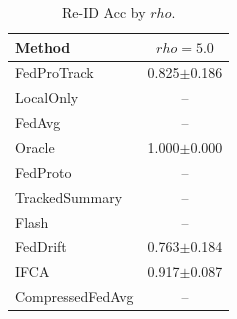 \begin{table}[t]
\centering
\caption{Re-ID Acc by $rho$.}
\label{tab:rho_concept_re_id_accuracy}
\begin{tabular}{lc}
\toprule
Method & $rho=5.0$ \\
\midrule
FedProTrack & 0.825$\pm$0.186 \\
LocalOnly & -- \\
FedAvg & -- \\
Oracle & 1.000$\pm$0.000 \\
FedProto & -- \\
TrackedSummary & -- \\
Flash & -- \\
FedDrift & 0.763$\pm$0.184 \\
IFCA & 0.917$\pm$0.087 \\
CompressedFedAvg & -- \\
\bottomrule
\end{tabular}
\end{table}